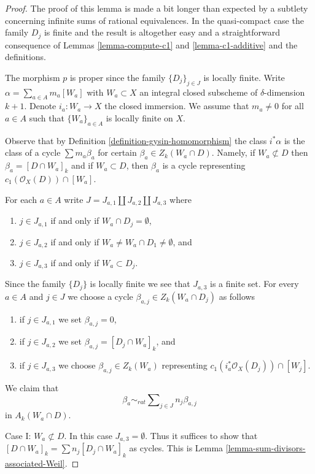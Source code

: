 \begin{proof}
The proof of this lemma is made a bit longer than expected
by a subtlety concerning infinite sums of rational equivalences.
In the quasi-compact case the family $D_j$ is finite and the result
is altogether easy and a straightforward consequence of
Lemmas \ref{lemma-compute-c1} and
\ref{lemma-c1-additive} and the definitions.

\medskip\noindent
The morphism $p$ is proper since the family $\{D_j\}_{j \in J}$
is locally finite. Write $\alpha = \sum_{a \in A} m_a [W_a]$
with $W_a \subset X$ an integral closed subscheme of
$\delta$-dimension $k + 1$.
Denote $i_a : W_a \to X$ the closed immersion.
We assume that $m_a \not = 0$ for all $a \in A$ such that
$\{W_a\}_{a \in A}$ is locally finite on $X$.

\medskip\noindent
Observe that
by Definition \ref{definition-gysin-homomorphism}
the class $i^*\alpha$ is the class of a cycle
$\sum m_a\beta_a$ for certain $\beta_a \in Z_k(W_a \cap D)$.
Namely, if $W_a \not \subset D$ then $\beta_a = [D \cap W_a]_k$
and if $W_a \subset D$, then $\beta_a$ is a cycle
representing $c_1(\mathcal{O}_X(D)) \cap [W_a]$.

\medskip\noindent
For each $a \in A$ write $J = J_{a, 1} \coprod J_{a, 2} \coprod J_{a, 3}$
where
\begin{enumerate}
\item $j \in J_{a, 1}$ if and only if $W_a \cap D_j = \emptyset$,
\item $j \in J_{a, 2}$ if and only if
$W_a \not = W_a \cap D_1 \not = \emptyset$, and
\item $j \in J_{a, 3}$ if and only if $W_a \subset D_j$.
\end{enumerate}
Since the family $\{D_j\}$ is locally finite we see that
$J_{a, 3}$ is a finite set. For every $a \in A$ and $j \in J$
we choose a cycle $\beta_{a, j} \in Z_k(W_a \cap D_j)$ as follows
\begin{enumerate}
\item if $j \in J_{a, 1}$ we set $\beta_{a, j} = 0$,
\item if $j \in J_{a, 2}$ we set $\beta_{a, j} = [D_j \cap W_a]_k$, and
\item if $j \in J_{a, 3}$ we choose $\beta_{a, j} \in Z_k(W_a)$
representing $c_1(i_a^*\mathcal{O}_X(D_j)) \cap [W_j]$.
\end{enumerate}
We claim that
$$
\beta_a \sim_{rat}
\sum\nolimits_{j \in J} n_j \beta_{a, j}
$$
in $A_k(W_a \cap D)$.

\medskip\noindent
Case I: $W_a \not \subset D$. In this case $J_{a, 3} = \emptyset$.
Thus it suffices to show that
$[D \cap W_a]_k = \sum n_j [D_j \cap W_a]_k$ as cycles.
This is Lemma \ref{lemma-sum-divisors-associated-Weil}.


\end{proof}
